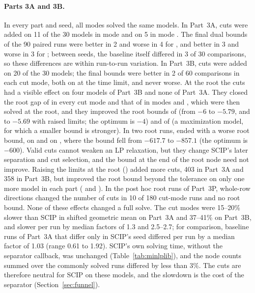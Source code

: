\paragraph{Parts 3A and 3B.} In every part and seed, all modes solved the same
models. In Part~3A, cuts were added on 11 of the 30 models in mode 
and on 5 in mode . The final dual bounds of the 90 paired runs were
better in 2 and worse in 4 for , and better in 3 and worse in 3 for
; between seeds, the baseline itself differed in 3 of 30
comparisons, so these differences are within run-to-run variation. In
Part~3B, cuts were added on 20 of the 30 models; the final bounds were better
in 2 of 60 comparisons in each cut mode, both on  at
the time limit, and never worse. At the root the cuts had a visible effect on
four models of Part~3B and none of Part~3A. They closed the root gap of
 in every cut mode and that of
 in modes  and , which were
then solved at the root, and they improved the root bounds of 
(from $-6$ to $-5.79$, and to $-5.69$ with raised limits; the optimum is $-4$)
and of  (a maximization model, for which a smaller bound is
stronger). In two root runs,  ended with a worse root
bound, on  and on , where the bound
fell from $-617.7$ to $-857.1$ (the optimum is $-600$). Valid cuts cannot
weaken an LP relaxation, but they change SCIP's later separation and cut
selection, and the bound at the end of the root node need not improve.
Raising the limits at the root () added more cuts, 403 in
Part~3A and 358 in Part~3B, but improved the root bound beyond the tolerance on
only one more model in each part ( and
). In the post hoc root runs of Part~3P, whole-row
directions changed the number of cuts in 10 of 180 cut-mode runs and no root
bound. None of these effects changed a full solve. The cut
modes were 15--20\% slower than SCIP in shifted geometric mean on
Part~3A and 37--41\% on Part~3B, and slower per run by median factors of 1.3 and
2.5--2.7; for comparison, baseline runs of Part~3A that differ only in SCIP's
seed differed per run by a median factor of 1.03 (range 0.61 to 1.92). SCIP's
own solving time, without the separator callback, was unchanged (Table~\ref{tab:minlplib}), and the node counts summed over the
commonly solved runs differed by less than 3\%. The cuts are therefore neutral
for SCIP on these models, and the slowdown is the cost of the separator
(Section~\ref{sec:funnel}).

